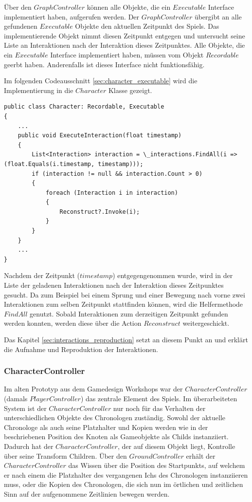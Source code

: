 Über den $GraphController$ können alle Objekte, die ein $Executable$ Interface implementiert haben, aufgerufen werden. Der $GraphController$ übergibt an alle gefundenen $Executable$ Objekte den aktuellen Zeitpunkt des Spiels. Das implementierende Objekt nimmt diesen Zeitpunkt entgegen und untersucht seine Liste an Interaktionen nach der Interaktion dieses Zeitpunktes. Alle Objekte, die ein $Executable$ Interface implementiert haben, müssen vom Objekt $Recordable$ geerbt haben. Anderenfalls ist dieses Interface nicht funktionsfähig.

Im folgenden Codeausschnitt \ref{sec:character_executable} wird die Implementierung in die $Character$ Klasse gezeigt.

\begin{lstlisting}[caption={Ausschnitt aus Character.ts dieses Prototyps}, label={sec:character_executable}]
public class Character: Recordable, Executable
{
    ...
    public void ExecuteInteraction(float timestamp)
    {
        List<Interaction> interaction = \_interactions.FindAll(i => (float.Equals(i.timestamp, timestamp)));
        if (interaction != null && interaction.Count > 0)
        {
            foreach (Interaction i in interaction)
            {
                Reconstruct?.Invoke(i);
            }
        }
    }
    ...
}
\end{lstlisting}

Nachdem der Zeitpunkt ($timestamp$) entgegengenommen wurde, wird in der Liste der geladenen Interaktionen nach der Interaktion dieses Zeitpunktes gesucht. Da zum Beispiel bei einem Sprung und einer Bewegung nach vorne zwei Interaktionen zum selben Zeitpunkt stattfinden können, wird die Helfermethode $FindAll$ genutzt. Sobald Interaktionen zum derzeitigen Zeitpunkt gefunden werden konnten, werden diese über die Action $Reconstruct$ weitergeschickt.

Das Kapitel \ref{sec:interactions_reproduction} setzt an diesem Punkt an und erklärt die Aufnahme und Reproduktion der Interaktionen.

\subsubsection{CharacterController}
Im alten Prototyp aus dem Gamedesign Workshops war der $CharacterController$ (damals $PlayerController$) das zentrale Element des Spiels. Im überarbeiteten System ist der $CharacterController$ nur noch für das Verhalten der unterschiedlichen Objekte des Chronologen zuständig. Sowohl der aktuelle Chronologe als auch seine Platzhalter und Kopien werden wie in der  beschriebenen Position des  Knoten als Gameobjekte als Childs instanziiert. Dadurch hat der $CharacterController$, der auf diesem  Objekt liegt, Kontrolle über seine Transform Children. Über den $GroundController$ erhält der $CharacterController$ das Wissen über die Position des Startpunkts, auf welchem er nach einem  die Platzhalter des vergangenen Ichs des Chronologen instanziieren muss, oder die Kopien des Chronologen, die sich nun im örtlichen und zeitlichen Sinn auf der aufgenommene Zeitlinien bewegen werden. 

